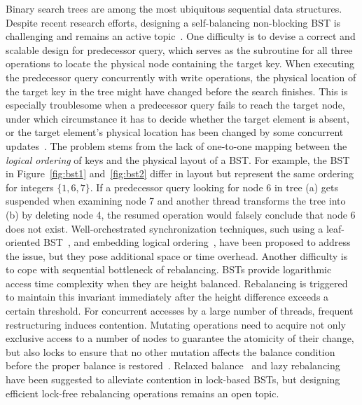 \documentclass[10pt,conference,compsocconf]{IEEEtran}
\begin{document}
Binary search trees are among the most ubiquitous sequential data structures. 
Despite recent research efforts, designing a self-balancing non-blocking BST is challenging and remains an active topic~\cite{brown2014general,natarajan2014fast,ellen2014amortized}.
One difficulty is to devise a correct and scalable design for predecessor query, which serves as the subroutine for all three operations to locate the physical node containing the target key.
When executing the predecessor query concurrently with write operations, the physical location of the target key in the tree might have changed before the search finishes.
This is especially troublesome when a predecessor query fails to reach the target node, under which circumstance it has to decide whether the target element is absent, or the target element's physical location has been changed by some concurrent updates~\cite{drachsler2014practical}. 
The problem stems from the lack of one-to-one mapping between the \emph{logical ordering} of keys and the physical layout of a BST.
For example, the BST in Figure~\ref{fig:bst1} and~\ref{fig:bst2} differ in layout but represent the same ordering for integers $\{1,6,7\}$.
If a predecessor query looking for node 6 in tree (a) gets suspended when examining node 7 and another thread transforms the tree into (b) by deleting node 4, the resumed operation would falsely conclude that node 6 does not exist.
Well-orchestrated synchronization techniques, such using a leaf-oriented BST~\cite{bronson2010practical}, and embedding logical ordering~\cite{drachsler2014practical}, have been proposed to address the issue, but they pose additional space or time overhead.
Another difficulty is to cope with sequential bottleneck of rebalancing.
BSTs provide logarithmic access time complexity when they are height balanced.
Rebalancing is triggered to maintain this invariant immediately after the height difference exceeds a certain threshold.
For concurrent accesses by a large number of threads, frequent restructuring induces contention.
Mutating operations need to acquire not only exclusive access to a number of nodes to guarantee the atomicity of their change, but also locks to ensure that no other mutation affects the balance condition before the proper balance is restored~\cite{bronson2010practical}. 
Relaxed balance~\cite{bronson2010practical} and lazy rebalancing~\cite{crain2013contention} have been suggested to alleviate contention in lock-based BSTs, but designing efficient lock-free rebalancing operations remains an open topic.
\end{document}
